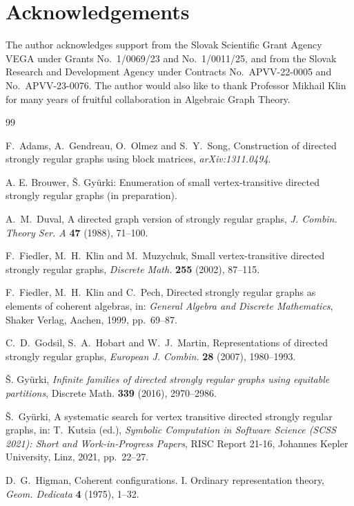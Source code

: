 \documentclass[11pt]{article}
\theoremstyle{definition}
\theoremstyle{remark}
\begin{document}
\section*{Acknowledgements}
The author acknowledges support from the Slovak Scientific Grant Agency VEGA under Grants No.~1/0069/23 and No.~1/0011/25, and from the Slovak Research and Development Agency under Contracts No.~APVV-22-0005 and No.~APVV-23-0076.
The author would also like to thank Professor Mikhail Klin for many years of fruitful collaboration in Algebraic Graph Theory.


\begin{thebibliography}{99}

F.~Adams, A.~Gendreau, O.~Olmez and S.~Y.~Song,
Construction of directed strongly regular graphs using block matrices,
\emph{arXiv:1311.0494}.

A. E. Brouwer, \v S. Gy\"urki: Enumeration of small vertex-transitive directed strongly regular graphs
(in preparation).

A.~M.~Duval, A directed graph version of strongly regular graphs,
\emph{J. Combin. Theory Ser. A} \textbf{47} (1988), 71--100.

F.~Fiedler, M.~H.~Klin and M.~Muzychuk,
Small vertex-transitive directed strongly regular graphs,
\emph{Discrete Math.} \textbf{255} (2002), 87--115.

F.~Fiedler, M.~H.~Klin and C.~Pech,
Directed strongly regular graphs as elements of coherent algebras,
in: \emph{General Algebra and Discrete Mathematics},
Shaker Verlag, Aachen, 1999, pp.~69--87.

C.~D.~Godsil, S.~A.~Hobart and W.~J.~Martin,
Representations of directed strongly regular graphs,
\emph{European J. Combin.} \textbf{28} (2007), 1980--1993.

\v{S}. Gy\"urki,
\emph{Infinite families of directed strongly regular graphs using equitable partitions},
Discrete Math. \textbf{339} (2016), 2970--2986.

\v{S}.~Gy\"urki,
A systematic search for vertex transitive directed strongly regular graphs,
in: T.~Kutsia (ed.), \emph{Symbolic Computation in Software Science
(SCSS 2021): Short and Work-in-Progress Papers},
RISC Report 21-16, Johannes Kepler University, Linz, 2021, pp.~22--27.

D.~G.~Higman, Coherent configurations. I. Ordinary representation theory,
\emph{Geom. Dedicata} \textbf{4} (1975), 1--32.


\end{thebibliography}
\end{document}
